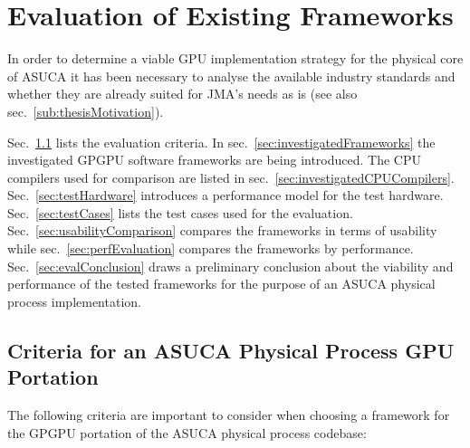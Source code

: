 \chapter{Evaluation of Existing Frameworks} \label{cha:evaluation}

In order to determine a viable GPU implementation strategy for the physical core of ASUCA it has been necessary to analyse the available industry standards and whether they are already suited for JMA's needs as is (see also sec.~\ref{sub:thesisMotivation}). 

Sec.~\ref{sec:criteriaPortation} lists the evaluation criteria. In sec.~\ref{sec:investigatedFrameworks} the investigated GPGPU software frameworks are being introduced. The CPU compilers used for comparison are listed in sec.~\ref{sec:investigatedCPUCompilers}. Sec.~\ref{sec:testHardware} introduces a performance model for the test hardware. Sec.~\ref{sec:testCases} lists the test cases used for the evaluation. Sec.~\ref{sec:usabilityComparison} compares the frameworks in terms of usability while sec.~\ref{sec:perfEvaluation} compares the frameworks by performance. Sec.~\ref{sec:evalConclusion} draws a preliminary conclusion about the viability and performance of the tested frameworks for the purpose of an ASUCA physical process implementation.

\section{Criteria for an ASUCA Physical Process GPU Portation} \label{sec:criteriaPortation}

The following criteria are important to consider when choosing a framework for the GPGPU portation of the ASUCA physical process codebase: 

